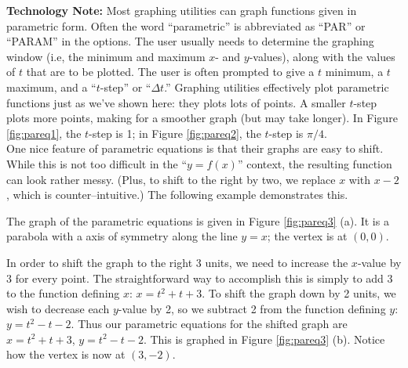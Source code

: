 \noindent\textbf{Technology Note:} Most graphing utilities can graph functions given in parametric form. Often the word ``parametric'' is abbreviated as ``PAR'' or ``PARAM'' in the  options. The user usually needs to determine the graphing window (i.e, the minimum and maximum $x$- and $y$-values), along with the values of $t$ that are to be plotted. The user is often prompted to give a $t$ minimum, a $t$ maximum, and a ``$t$-step'' or ``$\Delta t$.'' Graphing utilities effectively plot parametric functions just as we've shown here: they plots lots of points. A smaller $t$-step plots more points, making for a smoother graph (but may take longer). In Figure \ref{fig:pareq1}, the $t$-step is 1; in Figure \ref{fig:pareq2}, the $t$-step is $\pi/4$.\\

One nice feature of parametric equations is that their graphs are easy to shift. While this is not too difficult in the ``$y=f(x)$'' context, the resulting function can look rather messy. (Plus, to shift to the right by two, we replace $x$ with $x-2$, which is counter--intuitive.) The following example demonstrates this.\\

{The graph of the parametric equations is given in Figure \ref{fig:pareq3} (a). It is a parabola with a axis of symmetry along the line $y=x$; the vertex is at $(0,0)$. 

In order to shift the graph to the right 3 units, we need to increase the $x$-value by 3 for every point. The straightforward way to accomplish this is simply to add 3 to the function defining $x$: $x = t^2+t+3$. To shift the graph down by 2 units, we wish to decrease each $y$-value by 2, so we subtract 2 from the function defining $y$: $y = t^2-t-2$. Thus our parametric equations for the shifted graph are $x=t^2+t+3$, $y=t^2-t-2$. This is graphed in Figure \ref{fig:pareq3} (b). Notice how the vertex is now at $(3,-2)$. 
}\\

